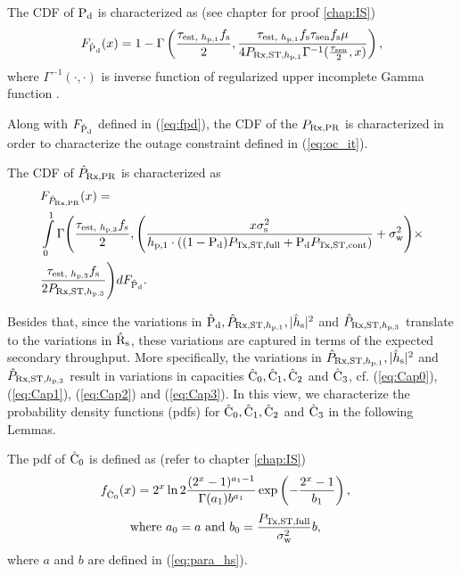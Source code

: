\begin{lemma} \label{lm:lem1}
\normalfont
The CDF of $\text{P}_{\text{d}}$ is characterized as (see chapter for proof \ref{chap:IS}) 
\begin{align}
F_{\hat{\text{P}}_{\text{d}}}(x) = 1 - \Gamma \left(\frac{\tau_{\text{est, $h_{\text{p,1}}$}} f_{\text{s}}}{2}, \frac{\tau_{\text{est, $h_{\text{p,1}}$}} f_{\text{s}} \tau_{\text{sen}} f_{\text{s}} \mu}{4 P_{\text{Rx,ST,$h_{\text{p,1}}$}} \Gamma^{-1}(\frac{\tau_{\text{sen}}}{2}, x) } \right), 
\label{eq:fpd}
\end{align}
where $\Gamma^{-1}(\cdot, \cdot)$ is inverse function of regularized upper incomplete Gamma function \cite{grad}.
\end{lemma}
Along with $F_{\hat{\text{P}}_{\text{d}}}$ defined in (\ref{eq:fpd}), the CDF of the $P_{\text{Rx,PR}}$ is characterized in order to characterize the outage constraint defined in (\ref{eq:oc_it}). 
\begin{lemma} \label{lm:lem2}
\normalfont
The CDF of $\hat{P}_{\text{Rx,PR}}$ is characterized as 
\begin{align}
&F_{\hat{P}_{\text{Rx,PR}}} (x) = \nonumber \\ 
&\int\limits_0^1 \Gamma \Bigg(\frac{\tau_{\text{est, $h_{\text{p,3}}$}} f_{\text{s}}}{2} , \Bigg( \frac{x \sigma^2_{\text{s}}}{h_{\text{p,1}} \cdot ((1 - \text{P}_{\text{d}}) P_{\text{Tx,ST,full}} + \text{P}_{\text{d}} P_{\text{Tx,ST,cont}})} + \sigma^2_{\text{w}}  \Bigg) \times \nonumber \\ 
&\frac{\tau_{\text{est, $h_{\text{p,3}}$}} f_{\text{s}}}{2 P_{\text{Rx,ST,$h_{\text{p,3}}$}}}  \Bigg) dF_{\hat{\text{P}}_{\text{d}}}. 
\label{eq:fprcvdpr}
\end{align}
\end{lemma}

Besides that, since the variations in $\hat{\text{P}}_{\text{d}}, \hat{P}_{\text{Rx,ST,$h_{\text{p,1}}$}}, |\hat{h}_{\text{s}}|^2$ and $\hat{P}_{\text{Rx,ST,$h_{\text{p,3}}$}}$ translate to the variations in $\hat{\text{{R}}}_{\text{s}}$, these variations are captured in terms of the expected secondary throughput. More specifically, the variations in $\hat{P}_{\text{Rx,ST,$h_{\text{p,1}}$}}, |\hat{h}_{\text{s}}|^2$ and $\hat{P}_{\text{Rx,ST,$h_{\text{p,3}}$}}$ result in variations in capacities $\hat{\text{C}}_{\text{0}}, \hat{\text{C}}_{\text{1}}, \hat{\text{C}}_{\text{2}}$ and $\hat{\text{C}}_{\text{3}}$, cf. (\ref{eq:Cap0}), (\ref{eq:Cap1}), (\ref{eq:Cap2}) and (\ref{eq:Cap3}). In this view, we characterize the probability density functions (pdfs) for $\hat{\text{C}}_{\text{0}}, \hat{\text{C}}_{\text{1}}, \hat{\text{C}}_{\text{2}}$ and $\hat{\text{C}}_{\text{3}}$ in the following Lemmas.
\begin{lemma} \label{lm:lem3}
\normalfont
The pdf of $\hat{\text{C}}_{\text{0}}$ is defined as (refer to chapter \ref{chap:IS}) 
\begin{align}
f_{\hat{\text{C}}_{\text{0}}}(x) &= 2^x \ln 2 \frac{(2^x - 1)^{a_1 - 1}}{\Gamma(a_1) b^{a_1}} \exp\left(-\frac{2^x - 1}{b_1}\right),  \label{eq:den_C0}
\end{align}
\begin{align}
\text{where  } a_0 = a &\text{ and } b_0 = \frac{P_{\text{Tx,ST,full}}}{\sigma^2_{\text{w}}} b,  \label{eq:den_C0_para} 
\end{align}
where $a$ and $b$ are defined in (\ref{eq:para_hs}).
\end{lemma}

